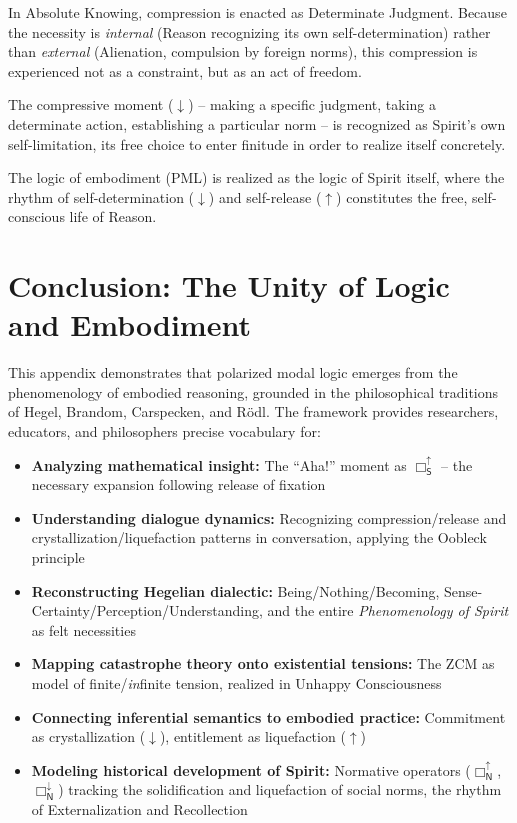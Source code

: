 \documentclass[12pt]{book}
\newcommand{\SBoxUp}{\Box_{\mathsf{S}}^{\uparrow}}
\newcommand{\NBoxUp}{\Box_{\mathsf{N}}^{\uparrow}}
\newcommand{\NBoxDown}{\Box_{\mathsf{N}}^{\downarrow}}
\begin{document}
In Absolute Knowing, compression is enacted as Determinate Judgment. Because the necessity is \textit{internal} (Reason recognizing its own self-determination) rather than \textit{external} (Alienation, compulsion by foreign norms), this compression is experienced not as a constraint, but as an act of freedom.

The compressive moment ($\downarrow$) -- making a specific judgment, taking a determinate action, establishing a particular norm -- is recognized as Spirit's own self-limitation, its free choice to enter finitude in order to realize itself concretely.

The logic of embodiment (PML) is realized as the logic of Spirit itself, where the rhythm of self-determination ($\downarrow$) and self-release ($\uparrow$) constitutes the free, self-conscious life of Reason.

\section{Conclusion: The Unity of Logic and Embodiment}

This appendix demonstrates that polarized modal logic emerges from the phenomenology of embodied reasoning, grounded in the philosophical traditions of Hegel, Brandom, Carspecken, and Rödl. The framework provides researchers, educators, and philosophers precise vocabulary for:

\begin{itemize}
\item \textbf{Analyzing mathematical insight:} The ``Aha!'' moment as $\SBoxUp$ -- the necessary expansion following release of fixation
\item \textbf{Understanding dialogue dynamics:} Recognizing compression/release and crystallization/liquefaction patterns in conversation, applying the Oobleck principle
\item \textbf{Reconstructing Hegelian dialectic:} Being/Nothing/Becoming, Sense-Certainty/Perception/Understanding, and the entire \emph{Phenomenology of Spirit} as felt necessities
\item \textbf{Mapping catastrophe theory onto existential tensions:} The ZCM as model of finite/\textit{in}finite tension, realized in Unhappy Consciousness
\item \textbf{Connecting inferential semantics to embodied practice:} Commitment as crystallization ($\downarrow$), entitlement as liquefaction ($\uparrow$)
\item \textbf{Modeling historical development of Spirit:} Normative operators ($\NBoxUp$, $\NBoxDown$) tracking the solidification and liquefaction of social norms, the rhythm of Externalization and Recollection
\end{itemize}
\end{document}
